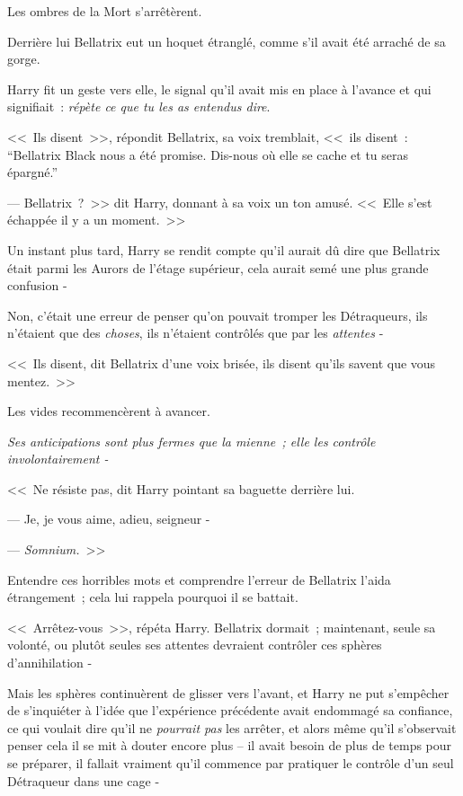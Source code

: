 Les ombres de la Mort s'arrêtèrent.

Derrière lui Bellatrix eut un hoquet étranglé, comme s'il avait été arraché de sa gorge.

Harry fit un geste vers elle, le signal qu'il avait mis en place à l'avance et qui signifiait~: \emph{répète ce que tu les as entendus dire}.

<<~Ils disent~>>, répondit Bellatrix, sa voix tremblait, <<~ils disent~: “Bellatrix Black nous a été promise. Dis-nous où elle se cache et tu seras épargné.”

--- Bellatrix~?~>> dit Harry, donnant à sa voix un ton amusé. <<~Elle s'est échappée il y a un moment.~>>

Un instant plus tard, Harry se rendit compte qu'il aurait dû dire que Bellatrix était parmi les Aurors de l'étage supérieur, cela aurait semé une plus grande confusion -

Non, c'était une erreur de penser qu'on pouvait tromper les Détraqueurs, ils n'étaient que des \emph{choses}, ils n'étaient contrôlés que par les \emph{attentes} -

<<~Ils disent, dit Bellatrix d'une voix brisée, ils disent qu'ils savent que vous mentez.~>>

Les vides recommencèrent à avancer.

\emph{Ses anticipations sont plus fermes que la mienne~; elle les contrôle involontairement -}

<<~Ne résiste pas, dit Harry pointant sa baguette derrière lui.

--- Je, je vous aime, adieu, seigneur -

--- \emph{Somnium.}~>>

Entendre ces horribles mots et comprendre l'erreur de Bellatrix l'aida étrangement~; cela lui rappela pourquoi il se battait.

<<~Arrêtez-vous~>>, répéta Harry. Bellatrix dormait~; maintenant, seule sa volonté, ou plutôt seules ses attentes devraient contrôler ces sphères d'annihilation -

Mais les sphères continuèrent de glisser vers l'avant, et Harry ne put s'empêcher de s'inquiéter à l'idée que l'expérience précédente avait endommagé sa confiance, ce qui voulait dire qu'il ne \emph{pourrait pas} les arrêter, et alors même qu'il s'observait penser cela il se mit à douter encore plus -- il avait besoin de plus de temps pour se préparer, il fallait vraiment qu'il commence par pratiquer le contrôle d'un seul Détraqueur dans une cage -


